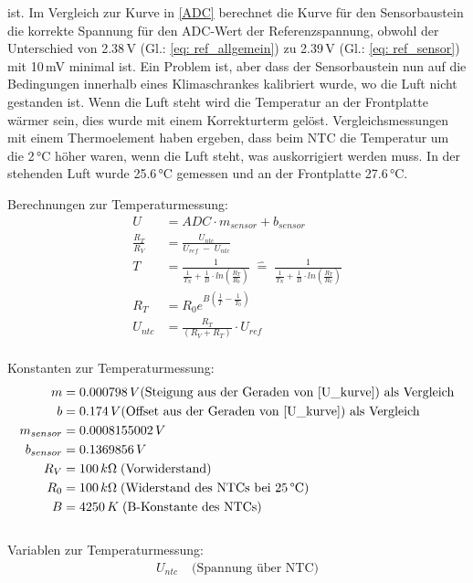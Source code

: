 ist. Im Vergleich zur Kurve in \ref{ADC} berechnet die Kurve für den Sensorbaustein die korrekte Spannung für den ADC-Wert der Referenzspannung, obwohl der Unterschied von 2.38\,V (Gl.: \ref{eq: ref_allgemein}) zu 2.39\,V (Gl.: \ref{eq: ref_sensor}) mit 10\,mV minimal ist. Ein Problem ist, aber dass der Sensorbaustein nun auf die Bedingungen innerhalb eines Klimaschrankes kalibriert wurde, wo die Luft nicht gestanden ist. Wenn die Luft steht wird die Temperatur an der Frontplatte wärmer sein, dies wurde mit einem Korrekturterm gelöst. Vergleichsmessungen mit einem Thermoelement haben ergeben, dass beim NTC die Temperatur um die 2\,°C höher waren, wenn die Luft steht, was auskorrigiert werden muss. In der stehenden Luft wurde 25.6\,°C gemessen und an der Frontplatte 27.6\,°C.
\\
\begin{center}	
Berechnungen zur Temperaturmessung:
\begin{align}
	U &= ADC \cdot m_{sensor} + b_{sensor} \label{eq: U_ADC_sensor}\\
	\frac{R_T}{R_V} &= \frac{U_{ntc}}{U_{ref}\;-\;U_{ntc}} \label{eq: R_T}\\
	T &= \frac{1}{\frac{1}{T_N}+\frac{1}{B} \cdot ln(\frac{R_T}{R_0})}\; 
	\widehat{=}\; \frac{1}{\frac{1}{T_N}+\frac{1}{B} \cdot ln(\frac{R_T}{R_V})}  \label{eq: T}\\
	R_T &= R_0 e^{B\left(\frac{1}{T} - \frac{1}{T_0}\right)} \label{eq: R_T,2}\\
	U_{ntc} &= \frac{R_T}{(R_V + R_T)} \cdot U_{ref} \label{eq: U_ntc}
\end{align}
\\
Konstanten zur Temperaturmessung:
\begin{align*}
	m &= 0.000798\,V \text{(Steigung aus der Geraden von \ref{U_kurve}) als Vergleich}\\
	b &= 0.174\,V \text{(Offset aus der Geraden von \ref{U_kurve}) als Vergleich}\\
	m_{sensor} &= 0.0008155002\,V\\
	b_{sensor} &= 0.1369856\,V\\
	R_V &= 100\,k\Omega\; \text{(Vorwiderstand)}\\
	R_0 &= 100\,k\Omega\; \text{(Widerstand des NTCs bei 25\,°C)}\\
	B &= 4250\,K\; \text{(B-Konstante des NTCs)}
\end{align*}
\\
Variablen zur Temperaturmessung:
\begin{align*}
 U_{ntc}\; &\text{(Spannung über NTC)}\\

\end{align*}
\end{center}
